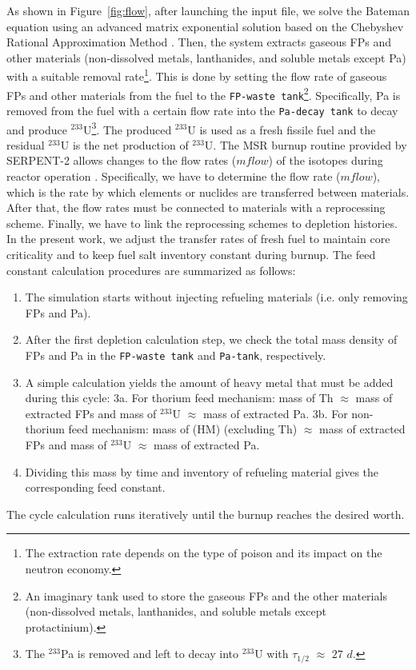 As shown in Figure~\ref{fig:flow}, after launching the input file, we solve the Bateman equation using an advanced 
matrix exponential solution based on the Chebyshev Rational Approximation 
Method \cite{isotalo2016improving}. 
Then, the system extracts gaseous \gls{FPs} and other materials 
(non-dissolved metals, lanthanides, and soluble metals except Pa) with 
a suitable removal rate\footnote{The extraction rate depends on the type of 
poison and its impact on the neutron
economy.}. This is done by setting the 
flow rate of gaseous \gls{FPs} and other materials from the fuel to the 
\texttt{FP-waste tank}\footnote{An imaginary tank used to store the gaseous 
\gls{FPs} and the other materials (non-dissolved metals, lanthanides, and 
soluble metals except protactinium).}. Specifically, Pa is removed 
from the fuel with a certain flow rate into the 
\texttt{Pa-decay tank} to decay and produce $^{233}$U\footnote{The 
$^{233}$Pa is removed and left to decay into $^{233}$U with $\tau_{1/2}$ 
$\approx$ $27$ $d$.}. The produced $^{233}$U is used as a fresh fissile fuel 
and the residual $^{233}$U is the net production of $^{233}$U. The MSR burnup 
routine provided by SERPENT-2 allows changes to the flow rates ($mflow$) of the 
isotopes during reactor operation \cite{aufiero2013extended}. Specifically, we have to determine the flow rate ($mflow$), which is the rate by 
which elements or nuclides are transferred between materials. After that, the 
flow rates must be connected to materials with a reprocessing scheme. 
Finally, we have to link the reprocessing schemes to depletion histories. In 
the present work, we adjust the transfer rates of fresh fuel to maintain core 
criticality and to keep fuel salt inventory constant during burnup. The feed constant calculation procedures are summarized as follows:
\begin{enumerate}
	\item The simulation starts without injecting refueling materials (i.e. only removing FPs and Pa).
	\item After the first depletion calculation step, we check the total mass density of FPs and Pa in the \texttt{FP-waste tank} and \texttt{Pa-tank}, respectively.
	\item A simple calculation yields the amount of heavy metal that must be added during this cycle:
	\subitem 3a. For thorium feed mechanism: mass of Th $\approx$ mass of extracted FPs and mass of $^{233}$U $\approx$ mass of extracted Pa.
	\subitem 3b. For non-thorium feed mechanism: mass of (HM) (excluding Th) $\approx$ mass of extracted FPs and mass of $^{233}$U $\approx$ mass of extracted Pa.
	\item Dividing this mass by time and inventory of refueling material gives the corresponding feed constant.
\end{enumerate}
The cycle calculation runs iteratively until the burnup reaches the desired worth.

